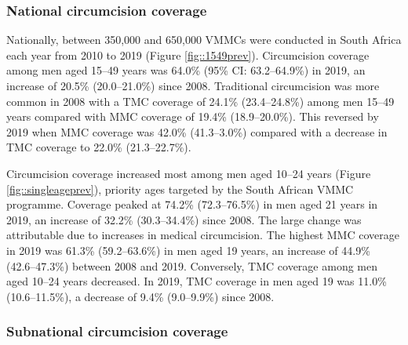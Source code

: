 \documentclass{article}
\begin{document}
\subsubsection*{National circumcision coverage}


Nationally, between 350,000 and 650,000 VMMCs were conducted in South Africa each year from 2010 to 2019 (Figure \ref{fig::1549prev}). Circumcision coverage among men aged 15--49 years was 64.0\% (95\% CI: 63.2--64.9\%) in 2019, an increase of 20.5\% (20.0--21.0\%) since 2008. Traditional circumcision was more common in 2008 with a TMC coverage of 24.1\% (23.4--24.8\%) among men 15--49 years compared with MMC coverage of 19.4\% (18.9--20.0\%). This reversed by 2019 when MMC coverage was  42.0\% (41.3--3.0\%) compared with a decrease in TMC coverage to 22.0\% (21.3--22.7\%).

Circumcision coverage increased most among men aged 10--24 years (Figure \ref{fig::singleageprev}), priority ages targeted by the South African VMMC programme. Coverage peaked at 74.2\% (72.3--76.5\%) in men aged 21 years in 2019, an increase of 32.2\% (30.3--34.4\%) since 2008. The large change was attributable due to increases in medical circumcision. The highest MMC coverage in 2019 was 61.3\% (59.2--63.6\%) in men aged 19 years, an increase of 44.9\% (42.6--47.3\%) between 2008 and 2019. Conversely, TMC coverage among men aged 10--24 years decreased. In 2019, TMC coverage in men aged 19 was 11.0\% (10.6--11.5\%), a decrease of 9.4\% (9.0--9.9\%) since 2008.


\subsubsection*{Subnational circumcision coverage}


\end{document}
